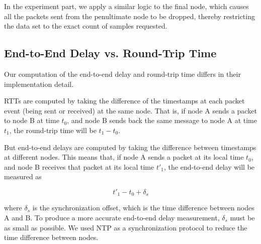 \documentclass[conference]{IEEEtran}
\begin{document}
In the experiment part, we apply a similar logic to the final node, which causes all the packets
sent from the penultimate node to be dropped, thereby restricting the data set to the exact count
of samples requested.

\subsection{End-to-End Delay vs. Round-Trip Time}
Our computation of the end-to-end delay and round-trip time differs in their implementation detail.

RTTs are computed by taking the difference of the timestamps at each packet event (being sent or
received) at the same node. That is, if node A sends a packet to node B at time $t_0$, and node
B sends back the same message to node A at time $t_1$, the round-trip time will be $t_1 - t_0$.

But end-to-end delays are computed by taking the difference between timestamps at different nodes.
This means that, if node A sends a packet at its local time $t_0$, and node B receives that packet
at its local time $t'_1$, the end-to-end delay will be measured as

$$
t'_1 - t_0 + \delta_{s}
$$

where $\delta_{s}$ is the synchronization offset, which is the time difference between nodes A
and B. To produce a more accurate end-to-end delay measurement, $\delta_{s}$ must be as small as
possible. We used NTP as a synchronization protocol to reduce the time difference between nodes.
\end{document}
